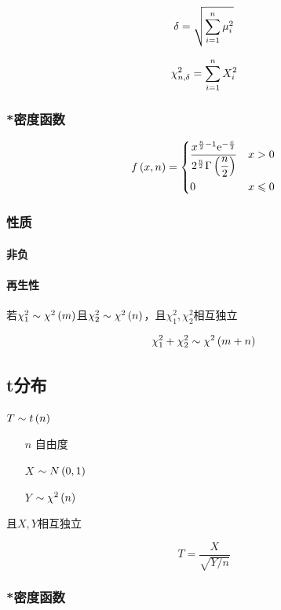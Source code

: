 \documentclass{article}
\begin{document}
\[\delta=\sqrt{\sum\limits_{i=1}^n\mu_i^2}\]

\[\chi_{n,\delta}^2=\sum\limits_{i=1}^n X_i^2\]

\subsubsection{*密度函数}

\[f\left(x,n\right)=
    \left\{\begin{aligned}
         & \frac{x^{\frac n2-1}\mathrm e^{-\frac x2}}{2^{\frac n2}\Gamma\left(\dfrac n2\right)} &  & x>0         \\
         & 0                                                                    &  & x\leqslant0
    \end{aligned}\right.\]

\subsubsection{性质}

\paragraph{非负}

\paragraph{再生性}

若$\chi_1^2\sim\chi^2\left(m\right)$且$\chi_2^2\sim\chi^2\left(n\right)$，且$\chi_1^2,\chi_2^2$相互独立

\[\chi_1^2+\chi_2^2\sim\chi^2\left(m+n\right)\]

\subsection{t分布}

$T\sim t\left(n\right)$

\begin{enumerate}
    \item [$n$] 自由度
    \item [$X$] $\sim N\left(0,1\right)$
    \item [$Y$] $\sim\chi^2\left(n\right)$
\end{enumerate}

且$X,Y$相互独立

\[T=\frac{X}{\sqrt{Y/n}}\]

\subsubsection{*密度函数}
\end{document}
